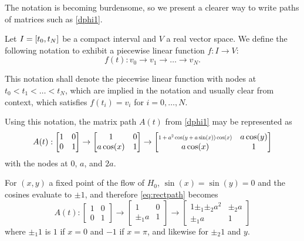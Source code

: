 The notation is becoming burdensome, so we present a clearer way to write paths of matrices such as \eqref{dphi1}.

\begin{definition}\label{def:pwlinear}
Let $I = \interval{t_0}{t_N}$ be a compact interval and $V$ a real vector space. We define the following notation to exhibit a piecewise linear function $f \colon I \to V$:
\begin{equation}
f(t) \colon v_0 \to v_1 \to \dots \to v_N.
\end{equation}

This notation shall denote the piecewise linear function with nodes at $t_0 < t_1 < \dots < t_N$, which are implied in the notation and usually clear from context, which satisfies $f(t_i) = v_i$ for $i = 0, \dots, N$.
\end{definition}

Using this notation, the matrix path $A(t)$ from \eqref{dphi1} may be represented as
\begin{equation}\label{eq:rectpath}
A(t) :
\begin{bmatrix}
1 & 0\\
0 & 1
\end{bmatrix}
\to
\begin{bmatrix}
1 & 0\\
a \cos(x) & 1
\end{bmatrix}
\to
\begin{bmatrix}
\scalebox{0.7}{$1+ a^2 \cos(y+a \sin(x)) \cos(x)$} &  a \cos(y)\\
a \cos(x) & 1
\end{bmatrix}
\end{equation}
with the nodes at $0$, $a$, and $2a$.

For $(x,y)$ a fixed point of the flow of $H_0$, $\sin(x) = \sin(y) = 0$ and the cosines evaluate to $\pm 1$, and therefore \ref{eq:rectpath} becomes
\begin{equation}\label{rectpath1}
A(t):
\begin{bmatrix}
1 & 0\\
0 & 1
\end{bmatrix}
\to
\begin{bmatrix}
1 & 0\\
\pm_1 a & 1
\end{bmatrix}
\to
\begin{bmatrix}
1 \pm_1 \pm_2 a^2 &  \pm_2 a\\
\pm_1 a & 1
\end{bmatrix}
\end{equation}
where $\pm_1 1$ is $1$ if $x=0$ and $-1$ if $x = \pi$, and likewise for $\pm_2 1$ and $y$.


